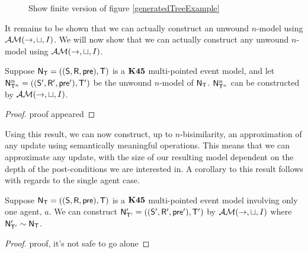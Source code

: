 \begin{figure}[ht!]
\centering
\caption{\FIXME Show finite version of figure \ref{generatedTreeExample}} \label{genSubtreeExample}
\end{figure}

It remains to be shown that we can actually construct an unwound $n$-model using
$\mathcal{AM}(\to,\sqcup,I)$.
We will now show that we can actually construct any unwound $n$-model using $\mathcal{AM}(\to,
\sqcup, I)$.

\begin{lemma} \label{unwoundNModelGenerated}
  Suppose $\mathrm{\mathsf{N}}_\mathrm{\mathsf{T}} = ((\mathrm{\mathsf{S}},\mathrm{\mathsf{R}},\mathrm{\mathsf{pre}}),\mathrm{\mathsf{T}})$ is a $\bf K45$ multi-pointed
  event model, and let $\mathrm{\mathsf{N}}^n_{\mathrm{\mathsf{T}}^n} = ((\mathrm{\mathsf{S}}', \mathrm{\mathsf{R}}', \mathrm{\mathsf{pre}}'),\mathrm{\mathsf{T}}')$ be the
  unwound $n$-model of $\mathrm{\mathsf{N}}_\mathrm{\mathsf{T}}$.
  $\mathrm{\mathsf{N}}^n_{\mathrm{\mathsf{T}}^n}$ can be constructed by $\mathcal{AM}(\to, \sqcup, I)$.
\end{lemma}
\begin{proof}
	\FIXME proof appeared
\end{proof}

Using this result, we can now construct, up to $n$-bisimilarity, an
approximation of any update using semantically meaningful operations.
This means that we can approximate any update, with the size of our resulting
model dependent on the depth of the post-conditions we are interested in.
A corollary to this result follows with regards to the single agent case.

\begin{corr}
  Suppose $\mathrm{\mathsf{N}}_\mathrm{\mathsf{T}} = ((\mathrm{\mathsf{S}},\mathrm{\mathsf{R}},\mathrm{\mathsf{pre}}),\mathrm{\mathsf{T}})$ is a $\bf K45$ multi-pointed
  event model involving only one agent, $a$.
  We can construct $\mathrm{\mathsf{N}}'_{\mathrm{\mathsf{T}}'} = ((\mathrm{\mathsf{S}}',\mathrm{\mathsf{R}}',\mathrm{\mathsf{pre}}'),\mathrm{\mathsf{T}}')$ by
  $\mathcal{AM}(\to,\sqcup,I)$ where $\mathrm{\mathsf{N}}'_{\mathrm{\mathsf{T}}'} \sim \mathrm{\mathsf{N}}_\mathrm{\mathsf{T}}$.
\end{corr}
\begin{proof}
	\FIXME proof, it's not safe to go alone
\end{proof}
